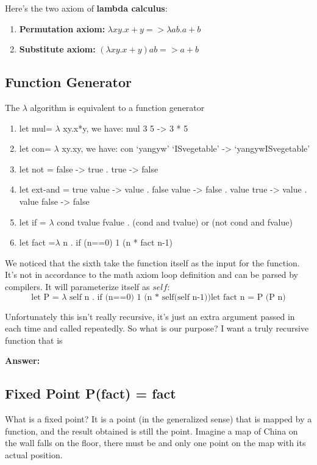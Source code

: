 \documentclass[a4paper]{article}
\theoremstyle{definition}
\begin{document}
Here's the two axiom of \textbf{lambda calculus}:
\begin{enumerate}
\item \textbf{Permutation axiom:} $\lambda xy.x+y=> \lambda ab.a+b$
\item \textbf{Substitute axiom:} $(\lambda xy.x+y)ab=>a+b$
\end{enumerate}

\subsection{Function Generator}

The $\lambda$ algorithm is equivalent to a function generator
\begin{enumerate}
    \item let mul= $\lambda$ xy.x*y, we have: mul 3 5 -> 3 * 5
    \item let con= $\lambda$ xy.xy, we have: con ‘yangyw’ ‘ISvegetable’ -> ‘yangywISvegetable’
    \item let not = false -> true . true -> false
    \item let ext-and = true value -> value . false value -> false . value true -> value . value false -> false
    \item let if = $\lambda$ cond tvalue fvalue . (cond and tvalue) or (not cond and fvalue)
    \item let fact =$\lambda$ n . if (n==0) 1 (n * fact n-1)
\end{enumerate}
We noticed that the sixth take the function itself as the input for the function. It's not in accordance to the math axiom loop definition and can be parsed by compilers. It will parameterize itself as $self$:
$$\text{let P = } \lambda\text{ self n . if (n==0) 1 (n * self(self n-1))$$
$$let fact n = P (P n)}$$


Unfortunately this isn't really recursive, it's just an extra argument passed in each time and called repeatedly. So what is our purpose? I want a truly recursive function that is

\textbf{Answer:}


\subsection{Fixed Point P(fact) = fact}
What is a fixed point? It is a point (in the generalized sense) that is mapped by a function, and the result obtained is still the point. Imagine a map of China on the wall falls on the floor, there must be and only one point on the map with its actual position.
\end{document}
